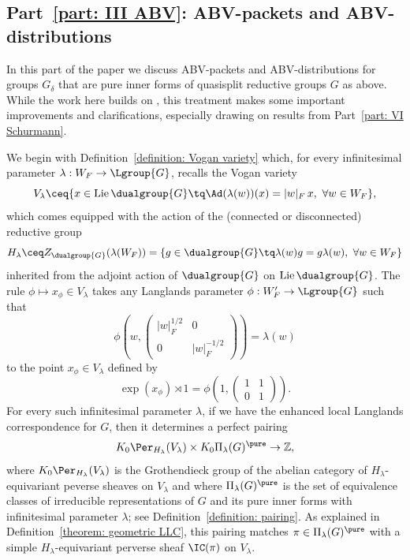 \documentclass[11pt,letterpaper]{amsart}
\numberwithin{equation}{section}
\begin{document}
\subsection{Part~\ref{part: III ABV}: ABV-packets and ABV-distributions} 

In this part of the paper we discuss ABV-packets and ABV-distributions for groups $G_\delta$ that are pure inner forms of quasisplit  reductive groups $G$ as above.
While the work here builds on \cite{CFMMX22}, this treatment makes some important improvements and clarifications, especially drawing on results from Part~\ref{part: VI Schurmann}.

We begin with Definition~\ref{definition: Vogan variety} which, for every infinitesimal parameter $\lambda : W_F \to \Lgroup{G}$, recalls the Vogan variety
\[
V_\lambda
\ceq
\{ x\in \mathrm{Lie}\,\dualgroup{G} \tq \Ad(\lambda(w))(x) = |w|_F\, x, \ \forall w\in W_F 
\},
\]
which comes equipped with the action of the (connected or disconnected) reductive group 
\[
H_\lambda 
\ceq 
Z_{\dualgroup{G}}(\lambda(W_F))
=
\{
g\in \dualgroup{G} \tq \lambda(w) g = g \lambda(w) ,\ \forall w\in W_F
\}
\]
inherited from the adjoint action of $\dualgroup{G}$ on $\mathrm{Lie}\,\dualgroup{G}$.
The rule $\phi \mapsto x_\phi \in V_\lambda$
takes any Langlands parameter $\phi: W'_F \to \Lgroup{G}$
such that
\[
\phi\left(w,\left(
\begin{smallmatrix}|w|_F^{1/2} & 0 \\ 0 & |w|_F^{-1/2}\end{smallmatrix}
\right)\right) 
=\lambda(w)
\]
to the point $x_\phi \in V_\lambda$ defined by
\[
\exp(x_\phi)\rtimes 1 = \phi\left(1,
\begin{pmatrix}1 & 1 \\ 0 & 1\end{pmatrix}\right).
\]
For every such infinitesimal parameter $\lambda$, if we have the enhanced local Langlands correspondence for $G$, then it determines a perfect pairing 
\begin{equation}\label{intro: pairing of GGs}
K_0 \Per_{H_\lambda}(V_\lambda) 
\times 
K_0 \Pi_{\lambda}(G)^\pure 
\to
\mathbb{Z},
\end{equation}
where 
$K_0 \Per_{H_\lambda}(V_\lambda)$ is the Grothendieck group of the abelian category of $H_\lambda$-equivariant peverse sheaves on $V_\lambda$ and where
$\Pi_\lambda(G)^\pure$ is the set of equivalence classes of irreducible representations of $G$ and its pure inner forms with infinitesimal parameter $\lambda$; see Definition~\ref{definition: pairing}. As explained in Definition~\ref{theorem: geometric LLC}, this pairing matches $\pi \in \Pi_\lambda(G)^\pure$ with a simple $H_\lambda$-equivariant perverse sheaf $\IC(\pi)$ on $V_\lambda$.
\end{document}
